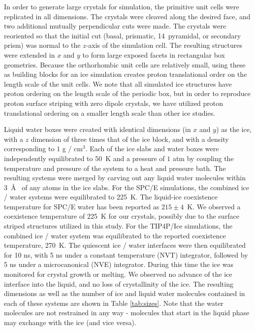 In order to generate large crystals for simulation, the primitive unit
cells were replicated in all dimensions. The crystals were cleaved along
the desired face, and two additional mutually perpendicular cuts were
made.  The crystals were reoriented so that the initial cut (basal,
prismatic, 14\degree~pyramidal, or secondary prism) was normal to the
$z$-axis of the simulation cell.  The resulting structures were
extended in $x$ and $y$ to form large exposed facets in rectangular
box geometries.  Because the orthorhombic unit cells are relatively
small, using these as building blocks for an ice simulation creates
proton translational order on the length scale of the unit cells. We
note that all simulated ice structures have proton ordering on the
length scale of the periodic box, but in order to reproduce proton
surface striping with zero dipole crystals, we have utilized proton
translational ordering on a smaller length scale than other ice
studies.

Liquid water boxes were created with identical dimensions (in $x$ and
$y$) as the ice, with a $z$ dimension of three times that of the ice
block, and with a density corresponding to $1$ g / cm$^3$.  Each of
the ice slabs and water boxes were independently equilibrated to
$50$~K and a pressure of $1$ atm by coupling the temperature and
pressure of the system to a heat and pressure bath. The resulting
systems were merged by carving out any liquid water molecules within
3~\AA~ of any atoms in the ice slabs.  For the SPC/E simulations, the
combined ice / water systems were equilibrated to 225~K. The
liquid-ice coexistence temperature for SPC/E water has been reported
as $215 \pm 4$~K.\cite{Vega2006a,Fernandez2006} We observed a
coexistence temperature of 225~K for our crystals, possibly due to the
surface striped structures utilized in this study. For the TIP4P/Ice
simulations, the combined ice / water system was equilibrated to the
reported coexistence temperature, 270~K.\cite{Vega2006a,Fernandez2006}
The quiescent ice / water interfaces were then equilibrated for 10 ns,
with 5 ns under a constant temperature (NVT) integrator, followed by 5
ns under a microcanonical (NVE) integrator.  During this time the ice
was monitored for crystal growth or melting. We observed no advance of
the ice interface into the liquid, and no loss of crystallinity of the
ice. The resulting dimensions as well as the number of ice and liquid
water molecules contained in each of these systems are shown in Table
\ref{tab:sizes}.  Note that the water molecules are not restrained in
any way - molecules that start in the liquid phase may exchange with
the ice (and vice versa).

